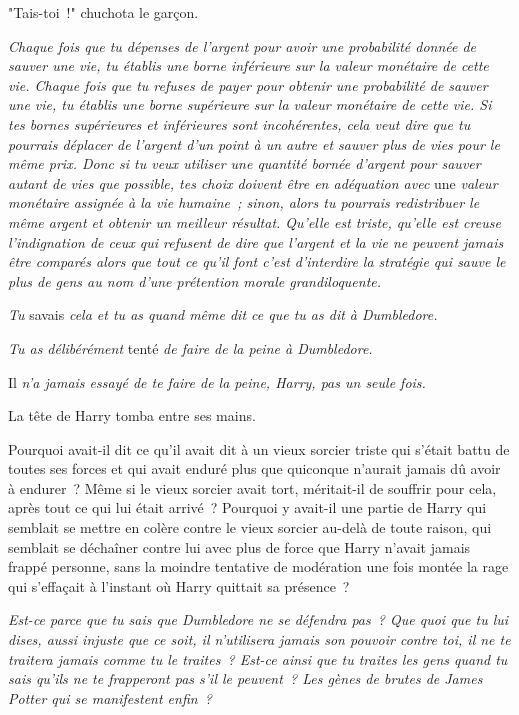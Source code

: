 "Tais-toi~!" chuchota le garçon.

\emph{Chaque fois que tu dépenses de l'argent pour avoir une probabilité donnée de sauver une vie, tu établis une borne inférieure sur la valeur monétaire de cette vie. Chaque fois que tu refuses de payer pour obtenir une probabilité de sauver une vie, tu établis une borne supérieure sur la valeur monétaire de cette vie. Si tes bornes supérieures et inférieures sont incohérentes, cela veut dire que tu pourrais déplacer de l'argent d'un point à un autre et sauver plus de vies pour le même prix. Donc si tu veux utiliser une quantité bornée d'argent pour sauver autant de vies que possible, tes choix doivent être en adéquation avec} une \emph{valeur monétaire assignée à la vie humaine~; sinon, alors tu pourrais redistribuer le même argent et obtenir un meilleur résultat. Qu'elle est triste, qu'elle est creuse l'indignation de ceux qui refusent de dire que l'argent et la vie ne peuvent jamais être comparés alors que tout ce qu'il font c'est d'interdire la stratégie qui sauve le plus de gens au nom d'une prétention morale grandiloquente.}

\emph{Tu} savais \emph{cela et tu as quand même dit ce que tu as dit à Dumbledore.}

\emph{Tu as délibérément} tenté \emph{de faire de la peine à Dumbledore.}

Il \emph{n'a jamais essayé de te faire de la peine, Harry, pas un seule fois.}

La tête de Harry tomba entre ses mains.

Pourquoi avait-il dit ce qu'il avait dit à un vieux sorcier triste qui s'était battu de toutes ses forces et qui avait enduré plus que quiconque n'aurait jamais dû avoir à endurer~? Même si le vieux sorcier avait tort, méritait-il de souffrir pour cela, après tout ce qui lui était arrivé~? Pourquoi y avait-il une partie de Harry qui semblait se mettre en colère contre le vieux sorcier au-delà de toute raison, qui semblait se déchaîner contre lui avec plus de force que Harry n'avait jamais frappé personne, sans la moindre tentative de modération une fois montée la rage qui s'effaçait à l'instant où Harry quittait sa présence~?

\emph{Est-ce parce que tu sais que Dumbledore ne se défendra pas~? Que quoi que tu lui dises, aussi injuste que ce soit, il n'utilisera jamais son pouvoir contre toi, il ne te traitera jamais comme tu le traites~? Est-ce ainsi que tu traites les gens quand tu sais qu'ils ne te frapperont pas s'il le peuvent~? Les gènes de brutes de James Potter qui se manifestent enfin~?}

